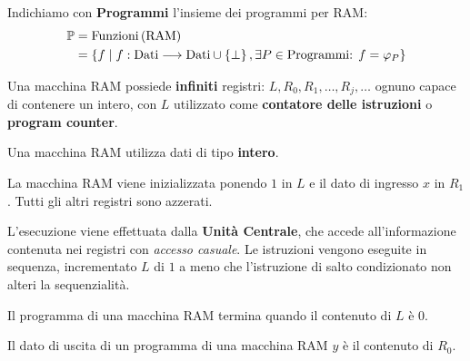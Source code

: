 \documentclass{lectures}
\begin{document}
\begin{multicols}{2}
\begin{definition}
    Indichiamo con \textbf{Programmi} l'insieme dei programmi per RAM:
    \begin{align*}
        \mathbb{P} &= \text{Funzioni}\left(\text{RAM}\right)\\
        &= \left\{f\mid f:\text{Dati}\longrightarrow \text{Dati}\cup\left\{\bot\right\}, \exists P \in \text{Programmi: }f = \varphi_P\right\}
    \end{align*}
\end{definition}
\begin{observation}
    Una macchina RAM possiede \textbf{infiniti} registri: \(
        L, R_0, R_1, \ldots, R_j, \ldots
    \) ognuno capace di contenere un intero, con \(L\) utilizzato come \textbf{contatore delle istruzioni} o \textbf{program counter}.
\end{observation}
\begin{observation}
    Una macchina RAM utilizza dati di tipo \textbf{intero}.
\end{observation}
\begin{observation}
    La macchina RAM viene inizializzata ponendo \(1\) in \(L\) e il dato di ingresso \(x\) in \(R_1\). Tutti gli altri registri sono azzerati.
\end{observation}
\begin{observation}
    L'esecuzione viene effettuata dalla \textbf{Unità Centrale}, che accede all'informazione contenuta nei registri con \textit{accesso casuale}. Le istruzioni vengono eseguite in sequenza, incrementato \(L\) di \(1\) a meno che l'istruzione di salto condizionato non alteri la sequenzialità.
\end{observation}
\begin{observation}
    Il programma di una macchina RAM termina quando il contenuto di \(L\) è 0.
\end{observation}
\begin{observation}
    Il dato di uscita di un programma di una macchina RAM \(y\) è il contenuto di \(R_0\).
\end{observation}
\end{multicols}
\clearpage
\end{document}
